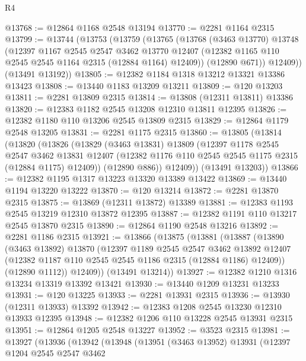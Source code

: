 \begin{lexlean}{R4}
\begin{coremodule}
@13768 := @12864 @1168 @2548 @13194
@13770 := @2281 @1164 @2315
@13799 := @13744
    (@13753
      (@13759
        (@13765
          (@13768
            (@3463 @13770)
            @13748
            (@12397
              @1167
              @2545
              @2547
              @3462
              @13770
              @12407
              (@12382 @1165 @110 @2545 @2545 @1164 @2315 (@12884 @1164) @12409))
            (@12890 @671))
          @12409))
      (@13491 @13192))
@13805 := @12382 @1184 @1318 @13212 @13321 @13386 @13423
@13808 := @13440 @1183 @13209 @13211
@13809 := @120 @13203
@13811 := @2281 @13809 @2315
@13814 := @13808 (@12311 @13811) @13386
@13820 := @12383 @1182 @2545 @13208 @12310 @13811 @12395
@13826 := @12382 @1180 @110 @13206 @2545 @13809 @2315
@13829 := @12864 @1179 @2548 @13205
@13831 := @2281 @1175 @2315
@13860 := @13805
    (@13814
      (@13820
        (@13826
          (@13829
            (@3463 @13831)
            @13809
            (@12397
              @1178
              @2545
              @2547
              @3462
              @13831
              @12407
              (@12382 @1176 @110 @2545 @2545 @1175 @2315 (@12884 @1175) @12409))
            (@12890 @886))
          @12409))
      (@13491 @13203))
@13866 := @12382 @1195 @1317 @13223 @13320 @13389 @13422
@13869 := @13440 @1194 @13220 @13222
@13870 := @120 @13214
@13872 := @2281 @13870 @2315
@13875 := @13869 (@12311 @13872) @13389
@13881 := @12383 @1193 @2545 @13219 @12310 @13872 @12395
@13887 := @12382 @1191 @110 @13217 @2545 @13870 @2315
@13890 := @12864 @1190 @2548 @13216
@13892 := @2281 @1186 @2315
@13921 := @13866
    (@13875
      (@13881
        (@13887
          (@13890
            (@3463 @13892)
            @13870
            (@12397
              @1189
              @2545
              @2547
              @3462
              @13892
              @12407
              (@12382 @1187 @110 @2545 @2545 @1186 @2315 (@12884 @1186) @12409))
            (@12890 @1112))
          @12409))
      (@13491 @13214))
@13927 := @12382 @1210 @1316 @13234 @13319 @13392 @13421
@13930 := @13440 @1209 @13231 @13233
@13931 := @120 @13225
@13933 := @2281 @13931 @2315
@13936 := @13930 (@12311 @13933) @13392
@13942 := @12383 @1208 @2545 @13230 @12310 @13933 @12395
@13948 := @12382 @1206 @110 @13228 @2545 @13931 @2315
@13951 := @12864 @1205 @2548 @13227
@13952 := @3523 @2315
@13981 := @13927
    (@13936
      (@13942
        (@13948
          (@13951
            (@3463 @13952)
            @13931
            (@12397
              @1204
              @2545
              @2547
              @3462

\end{coremodule}
\end{lexlean}
